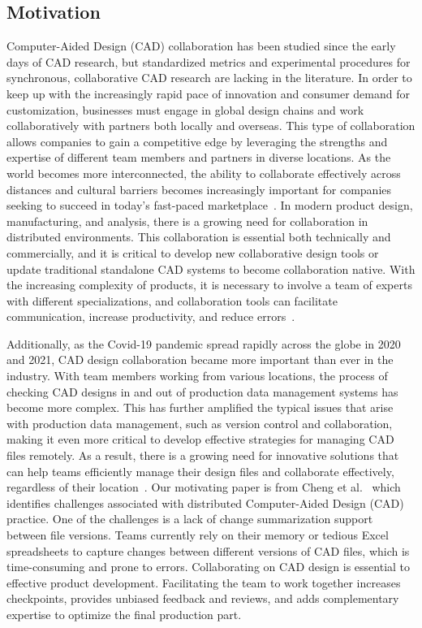 \documentclass[sigconf,authorversion,nonacm]{acmart}
\begin{document}
\subsection{Motivation}
Computer-Aided Design (CAD) collaboration has been studied since the early days of CAD research, but standardized metrics and experimental procedures for synchronous, collaborative CAD research are lacking in the literature. In order to keep up with the increasingly rapid pace of innovation and consumer demand for customization, businesses must engage in global design chains and work collaboratively with partners both locally and overseas. 
This type of collaboration allows companies to gain a competitive edge by leveraging the strengths and expertise of different team members and partners in diverse locations. 
As the world becomes more interconnected, the ability to collaborate effectively across distances and cultural barriers becomes increasingly important for companies seeking to succeed in today's fast-paced marketplace~\cite{fuh2005advances}. 
In modern product design, manufacturing, and analysis, there is a growing need for collaboration in distributed environments. This collaboration is essential both technically and commercially, and it is critical to develop new collaborative design tools or update traditional standalone CAD systems to become collaboration native. 
With the increasing complexity of products, it is necessary to involve a team of experts with different specializations, and collaboration tools can facilitate communication, increase productivity, and reduce errors~\cite{fuh2005advances}. 

Additionally, as the Covid-19 pandemic spread rapidly across the globe in 2020 and 2021, CAD design collaboration became more important than ever in the industry. 
With team members working from various locations, the process of checking CAD designs in and out of production data management systems has become more complex. 
This has further amplified the typical issues that arise with production data management, such as version control and collaboration, making it even more critical to develop effective strategies for managing CAD files remotely. 
As a result, there is a growing need for innovative solutions that can help teams efficiently manage their design files and collaborate effectively, regardless of their location~\cite{armstrong}. 
Our motivating paper is from Cheng et al.~\cite{cheng2023age} which identifies challenges associated with distributed Computer-Aided Design (CAD) practice. One of the challenges is a lack of change summarization support between file versions. 
Teams currently rely on their memory or tedious Excel spreadsheets to capture changes between different versions of CAD files, which is time-consuming and prone to errors. Collaborating on CAD design is essential to effective product development. 
Facilitating the team to work together increases checkpoints, provides unbiased feedback and reviews, and adds complementary expertise to optimize the final production part. 
\end{document}
